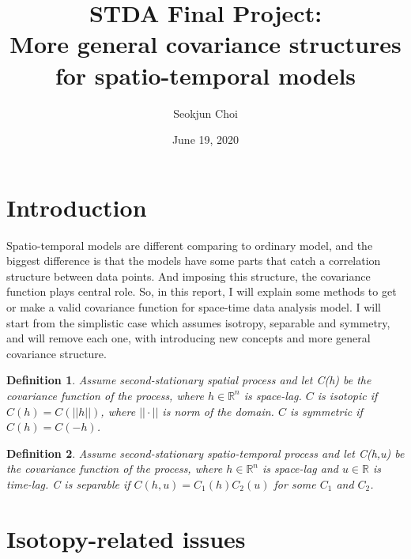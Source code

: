 \documentclass{article}
\newtheorem*{definition}{Definition}
\begin{document}
\title{STDA Final Project: \\ More general covariance structures for spatio-temporal models}
\author{Seokjun Choi}
\date{June 19, 2020}
\maketitle


\section{Introduction}

Spatio-temporal models are different comparing to ordinary model, and the biggest difference is that
the models have some parts that catch a correlation structure between data points.
And imposing this structure, the covariance function plays central role.
So, in this report, I will explain some methods to get or make a valid covariance function for space-time data analysis model.
I will start from the simplistic case which assumes isotropy, separable and symmetry,
and will remove each one, with introducing new concepts and more general covariance structure.
\begin{definition}
    Assume second-stationary spatial process and let C(h) be the covariance function of the process, where $h\in\mathbb R^n$ is space-lag.
    $C$ is isotopic if $C(h)=C(||h||)$, where $||\cdot||$ is norm of the domain.
    $C$ is symmetric if $C(h)=C(-h)$.
\end{definition}
\begin{definition}
    Assume second-stationary spatio-temporal process and let C(h,u) be the covariance function of the process, where $h\in\mathbb R^n$ is space-lag and $u\in\mathbb R$ is time-lag.
    C is separable if $C(h,u)=C_1(h)C_2(u)$ for some $C_1$ and $C_2$.
\end{definition}

\section{Isotopy-related issues}
\end{document}
